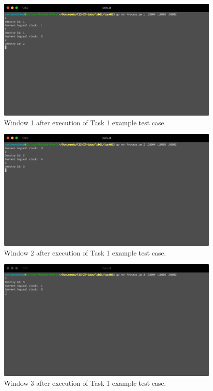 \documentclass[a4paper, 11pt]{article}
\begin{document}
\begin{figure}[h]
  \begin{center}
  \includegraphics[width=4.5in]{./imgs/task1_example_window1.png}
  \caption{Window 1 after execution of Task 1 example test case.}
  \label{img_task1_example_window1}
  \end{center}
\end{figure}

\begin{figure}[h]
  \begin{center}
  \includegraphics[width=4.5in]{./imgs/task1_example_window2.png}
  \caption{Window 2 after execution of Task 1 example test case.}
  \label{img_task1_example_window2}
  \end{center}
\end{figure}

\begin{figure}[h]
  \begin{center}
  \includegraphics[width=4.5in]{./imgs/task1_example_window3.png}
  \caption{Window 3 after execution of Task 1 example test case.}
  \label{img_task1_example_window3}
  \end{center}
\end{figure}
\end{document}

